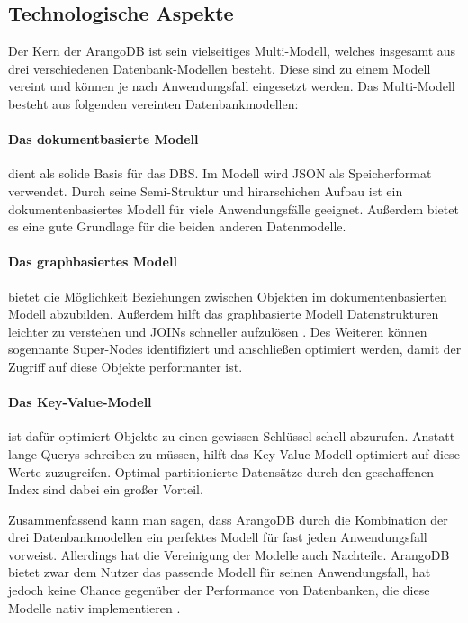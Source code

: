  \subsection{Technologische Aspekte}
Der Kern der ArangoDB ist sein vielseitiges Multi-Modell, welches insgesamt aus drei verschiedenen Datenbank-Modellen besteht. Diese sind zu einem Modell vereint und können je nach Anwendungsfall eingesetzt werden. Das Multi-Modell besteht aus folgenden  vereinten Datenbankmodellen:

\paragraph{Das dokumentbasierte Modell} dient als solide Basis für das \ac{DBS}. Im Modell wird \ac{JSON} als Speicherformat verwendet. Durch seine Semi-Struktur und hirarschichen Aufbau ist  ein dokumentenbasiertes Modell für viele Anwendungsfälle geeignet\cite{AWS_doc}.  Außerdem bietet es eine gute Grundlage für die beiden anderen Datenmodelle.

\paragraph{Das graphbasiertes Modell} bietet die Möglichkeit Beziehungen zwischen Objekten im dokumentenbasierten Modell abzubilden. Außerdem hilft das graphbasierte Modell Datenstrukturen leichter zu verstehen und JOINs schneller aufzulösen \cite{AWS_graph}. Des Weiteren können sogennante Super-Nodes identifiziert und anschließen optimiert werden, damit der Zugriff auf diese Objekte performanter ist.

\paragraph{Das Key-Value-Modell} ist dafür optimiert Objekte zu einen gewissen Schlüssel schell abzurufen.  Anstatt lange Querys schreiben zu müssen, hilft das Key-Value-Modell optimiert auf diese Werte zuzugreifen. Optimal partitionierte Datensätze durch den geschaffenen Index sind dabei ein großer Vorteil. \cite{AWS_keyvalue}

Zusammenfassend kann man sagen, dass ArangoDB durch die Kombination der drei Datenbankmodellen ein perfektes Modell für fast jeden Anwendungsfall vorweist. Allerdings hat die Vereinigung der Modelle auch Nachteile. ArangoDB bietet zwar dem Nutzer das passende Modell für seinen Anwendungsfall, hat jedoch keine Chance gegenüber der Performance von Datenbanken, die diese Modelle nativ implementieren \cite{ADB_benchmark}.

